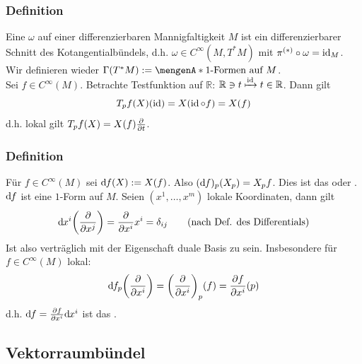 \subsubsection[Definition: $1$-Form]{Definition} %
\label{ssub:421}
Eine  $\omega$ auf einer differenzierbaren Mannigfaltigkeit $M$ ist ein differenzierbarer Schnitt des Kotangentialbündels, d.h. 
$\omega \in C^\infty(M, T^*M)$ mit $\pi^{(*)} \circ \omega = \operatorname{id}_M$. Wir definieren wieder $\Gamma(T^*M) := \set{1 \text{-Formen auf }M}$. \smallskip \\
Sei $f \in C^\infty(M)$. Betrachte Testfunktion auf $\mathds{R}$: $\mathbb{R} \ni t \xmapsto{\operatorname{id}} t \in \mathbb{R}$. Dann gilt
\[
	T_p f (X) (\operatorname{id}) = X( \operatorname{id} \circ f) = X(f)
\]
d.h. lokal gilt $T_p f(X) = X(f) \frac{{\partial }}{{\partial t}} $.

\subsubsection[Definition: Totales Differential]{Definition} %
\label{ssub:422}
Für $f \in C^\infty(M)$ sei $\mathrm{d}\mkern-1.0mu  f(X) := X(f)$. Also $(\mathrm{d}\mkern-1.0mu f)_p (X_p) = X_p f$. Dies ist das  oder 
. $\mathrm{d}\mkern-1.0mu f$ ist eine $1$-Form auf $M$. Seien $(x^1, \ldots , x^m)$ lokale Koordinaten, dann gilt
\[
	\mathd x^i \enbrace*{\diff{}{x^j} } = \diff{}{x^i} x^i = \delta_{ij}  \tag{nach Def. des Differentials}
\]
Ist also verträglich mit der Eigenschaft duale Basis zu sein. Insbesondere für $f \in C^\infty(M)$ lokal:
\[
	\mathd  f_p \enbrace*{\diff{}{x^i} } = \enbrace*{\diff{}{x^i} }_p (f) = \diff{f}{x^i} (p)   
\]
d.h. $\mathrm{d}\mkern-1.0mu  f = \frac{{\partial f}}{{\partial x^i}}  \mathrm{d}\mkern-1.0mu x^i $ ist das . 

\subsection{Vektorraumbündel} %
\label{sub:43}
